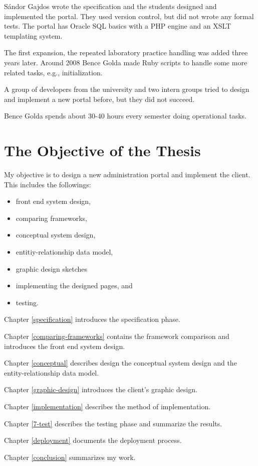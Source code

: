 Sándor Gajdos wrote the specification and the students designed and implemented the portal. They used version control, but did not wrote any formal tests. The portal has Oracle SQL basics with a PHP engine and an XSLT templating system.

The first expansion, the repeated laboratory practice handling was added three years later. Around 2008 Bence Golda made Ruby scripts to handle some more related tasks, e.g., initialization.

A group of developers from the university and two intern groups tried to design and implement a new portal before, but they did not succeed.

Bence Golda spends about 30-40 hours every semester doing operational tasks.

\section{The Objective of the Thesis}
My objective is to design a new administration portal and implement the client. This includes the followings:

\begin{itemize}
	\item front end system design,
	\item comparing frameworks,
	\item conceptual system design,
	\item entitiy-relationship data model,
	\item graphic design sketches
	\item implementing the designed pages, and
	\item testing.
\end{itemize}

Chapter \ref{specification} introduces the specification phase.

Chapter \ref{comparing-frameworks} contains the framework comparison and introduces the front end system design.

Chapter \ref{conceptual} describes design the conceptual system design and the entity-relationship data model.

Chapter \ref{graphic-design} introduces the client's graphic design.

Chapter \ref{implementation} describes the method of implementation.

Chapter \ref{7-test} describes the testing phase and summarize the results.

Chapter \ref{deployment}  documents the deployment process.

Chapter \ref{conclusion} summarizes my work.



